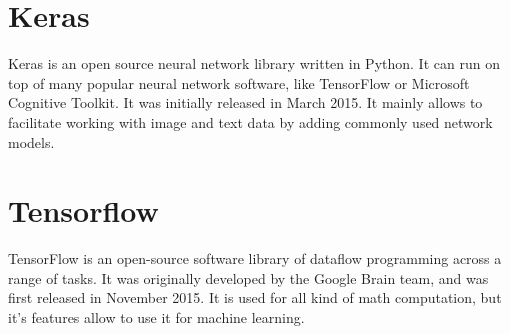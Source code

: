 \section{Keras}
Keras is an open source neural network library written in Python. It can run on top of many popular neural network software, like TensorFlow or Microsoft Cognitive Toolkit.
It was initially released in March 2015. It mainly allows to facilitate working with image and text data by adding commonly used network models.

\section{Tensorflow}
TensorFlow is an open-source software library of dataflow programming across a range of tasks. It was originally developed by the Google Brain team, and was first released in November 2015.
It is used for all kind of math computation, but it's features allow to use it for machine learning.


